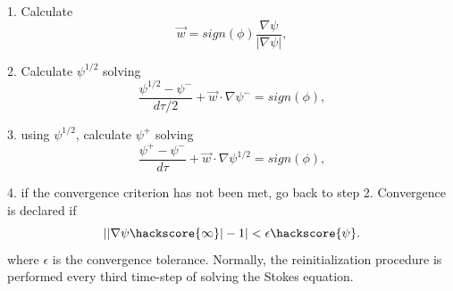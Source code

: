 1. Calculate
%
\begin{equation}
\vec{w} = sign(\phi)\frac{\nabla \psi}{|\nabla \psi|},
\label{REINITIAL MIDPOINT1}
\end{equation}
%

2. Calculate $\psi^{1/2}$ solving
%
\begin{equation}
\frac{\psi^{1/2} - \psi^{-}}{d\tau/2} + \vec{w} \cdot \nabla \psi^{-}= sign(\phi),
\label{REINITIAL MIDPOINT2}
\end{equation}
%

3. using $\psi^{1/2}$, calculate $\psi^{+}$ solving
%
\begin{equation}
\frac{\psi^{+} - \psi^{-}}{d\tau} + \vec{w} \cdot \nabla \psi^{1/2}= sign(\phi),
\label{REINITIAL MIDPOINT3}
\end{equation}
%

4. if the convergence criterion has not been met, go back to step 2. Convergence is declared if
%
\begin{equation}
||\nabla \psi \hackscore{\infty}| - 1| < \epsilon \hackscore{\psi}.
\label{REINITIAL CONVERGE}
\end{equation}
%
where $\epsilon$ is the convergence tolerance. Normally, the reinitialization procedure is performed every third time-step of solving the Stokes equation.

